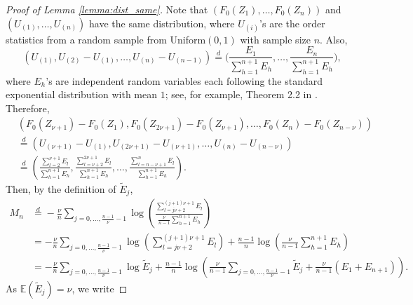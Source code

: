 \documentclass[12pt,letterpaper, twoside, openany]{article}
\theoremstyle{plain}
\begin{document}
\begin{proof}[Proof of Lemma \ref{lemma:dist_same}]
	Note that $(F_0(Z_1),\ldots,F_0(Z_n))$ and $(U_{(1)},\ldots,U_{(n)})$ have the same distribution, where $U_{(i)}$'s are the order statistics from a random sample from Uniform$(0,1)$ with  sample size $n$. Also,
	\begin{equation*}
		(U_{(1)}, U_{(2)} - U_{(1)},\ldots, U_{(n)} - U_{(n-1)} ) \stackrel{d}{=} \bigg( \frac{E_1}{\sum^{n+1}_{h=1} E_h}, \ldots, \frac{E_n}{\sum^{n+1}_{h=1} E_h}\bigg), 
	\end{equation*}
	where $E_h$'s are independent random variables each following the standard exponential distribution with mean $1$; see, for example, Theorem 2.2 in \cite{Devroye1986}. Therefore,
\begin{align*}
    &(F_0(Z_{\nu+1}) - F_0(Z_1), F_0(Z_{2\nu+1}) - F_0(Z_{\nu+1}), \ldots, F_0(Z_n) - F_0(Z_{n-\nu}))\\ &\stackrel{d}{=} (U_{(\nu+1)} - U_{(1)}, U_{(2\nu+1)} - U_{(\nu+1)}, \ldots, U_{(n)} - U_{(n-\nu)})\\
    &\stackrel{d}{=} \left(\frac{ \sum^{\nu+1}_{l=2}E_l}{\sum^{n+1}_{h=1}E_h}, \frac{\sum^{2\nu+1}_{l=\nu+2}E_l}{\sum^{n+1}_{h=1}E_h },\ldots, 
    \frac{\sum^{n}_{l=n-\nu+1}E_l}{\sum^{n+1}_{h=1}E_h } \right).
\end{align*}
Then, by the definition of $\tilde{E}_j$,
\begin{align*}
    M_n	& \stackrel{d}{=} - \frac{\nu}{n} \sum_{j=0,\ldots, \frac{n-1}{\nu}-1}
    \log \left( \frac{ \sum^{(j+1)\nu+1}_{l=j\nu+2} E_l}{\frac{\nu}{n-1}\sum^{n+1}_{h=1} E_h } \right) \\
    &= - \frac{\nu}{n} \sum_{j=0,\ldots, \frac{n-1}{\nu}-1} \log \left( \sum^{(j+1)\nu+1}_{l=j\nu+2} E_l \right) + \frac{n-1}{n} \log \left( \frac{\nu}{n-1}\sum^{n+1}_{h=1} E_h \right)\\
& =- \frac{\nu}{n} 	\sum_{j=0,\ldots,\frac{n-1}{\nu}-1}  \log \tilde{E}_j +  \frac{n-1}{n} \log \left( \frac{\nu}{n-1} \sum_{j=0,\ldots,\frac{n-1}{\nu}-1} \tilde{E}_j + \frac{\nu}{n-1} (E_1 + E_{n+1})\right).
\end{align*}
	As $\mathbb{E}(\tilde{E}_j) = \nu$, we write

\end{proof}
\end{document}
